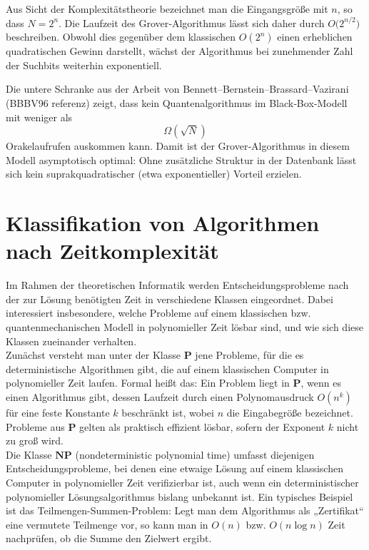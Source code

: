 Aus Sicht der Komplexitätstheorie bezeichnet man die Eingangsgröße mit \(n\), so dass $N = 2^n$.
Die Laufzeit des Grover‐Algorithmus lässt sich daher durch  
$O\bigl(2^{n/2}\bigr)$ beschreiben. Obwohl dies gegenüber dem klassischen \(O(2^n)\) einen erheblichen quadratischen Gewinn darstellt, wächst der Algorithmus bei zunehmender Zahl der Suchbits weiterhin exponentiell.

Die untere Schranke aus der Arbeit von Bennett–Bernstein–Brassard–Vazirani (BBBV96 referenz) zeigt, dass kein Quantenalgorithmus im Black‐Box‐Modell mit weniger als  
\[
\Omega(\sqrt{N})
\]  
Orakelaufrufen auskommen kann. Damit ist der Grover‐Algorithmus in diesem Modell asymptotisch optimal: Ohne zusätzliche Struktur in der Datenbank lässt sich kein suprakquadratischer (etwa exponentieller) Vorteil erzielen.  


\section{Klassifikation von Algorithmen nach Zeitkomplexität}

Im Rahmen der theoretischen Informatik werden Entscheidungsprobleme nach der zur Lösung benötigten Zeit in verschiedene Klassen eingeordnet. Dabei interessiert insbesondere, welche Probleme auf einem klassischen bzw. quantenmechanischen Modell in polynomieller Zeit lösbar sind, und wie sich diese Klassen zueinander verhalten.\\

Zunächst versteht man unter der Klasse \(\mathbf{P}\) jene Probleme, für die es deterministische Algorithmen gibt, die auf einem klassischen Computer in polynomieller Zeit laufen. Formal heißt das: Ein Problem liegt in \(\mathbf{P}\), wenn es einen Algorithmus gibt, dessen Laufzeit durch einen Polynomausdruck \(O(n^k)\) für eine feste Konstante \(k\) beschränkt ist, wobei \(n\) die Eingabegröße bezeichnet. Probleme aus \(\mathbf{P}\) gelten als praktisch effizient lösbar, sofern der Exponent \(k\) nicht zu groß wird.\\

Die Klasse \(\mathbf{NP}\) (nondeterministic polynomial time) umfasst diejenigen Entscheidungsprobleme, bei denen eine etwaige Lösung auf einem klassischen Computer in polynomieller Zeit verifizierbar ist, auch wenn ein deterministischer polynomieller Lösungsalgorithmus bislang unbekannt ist. Ein typisches Beispiel ist das Teilmengen-Summen-Problem: Legt man dem Algorithmus als „Zertifikat“ eine vermutete Teilmenge vor, so kann man in \(O(n)\) bzw. \(O(n\log n)\) Zeit nachprüfen, ob die Summe den Zielwert ergibt.\\

